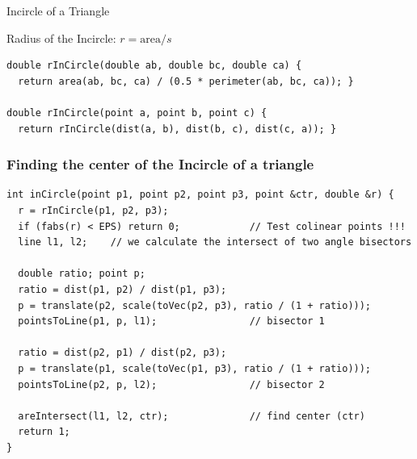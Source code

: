 \begin{frame}[fragile]{Incircle of a Triangle}
    \begin{exampleblock}{Radius of the Incircle: $r = \text{area}/s$}
      {\smaller
\begin{verbatim}
double rInCircle(double ab, double bc, double ca) {
  return area(ab, bc, ca) / (0.5 * perimeter(ab, bc, ca)); }

double rInCircle(point a, point b, point c) {
  return rInCircle(dist(a, b), dist(b, c), dist(c, a)); }
\end{verbatim}}

    \end{exampleblock}
\end{frame}

\begin{frame}[fragile]
  \frametitle{Finding the center of the Incircle of a triangle}
  {\smaller
    \begin{exampleblock}{}
\begin{verbatim}
int inCircle(point p1, point p2, point p3, point &ctr, double &r) {
  r = rInCircle(p1, p2, p3);
  if (fabs(r) < EPS) return 0;            // Test colinear points !!!
  line l1, l2;    // we calculate the intersect of two angle bisectors

  double ratio; point p;
  ratio = dist(p1, p2) / dist(p1, p3);
  p = translate(p2, scale(toVec(p2, p3), ratio / (1 + ratio)));
  pointsToLine(p1, p, l1);                // bisector 1

  ratio = dist(p2, p1) / dist(p2, p3);
  p = translate(p1, scale(toVec(p1, p3), ratio / (1 + ratio)));
  pointsToLine(p2, p, l2);                // bisector 2

  areIntersect(l1, l2, ctr);              // find center (ctr)
  return 1;
}
\end{verbatim}
    \end{exampleblock}
    }
\end{frame}

